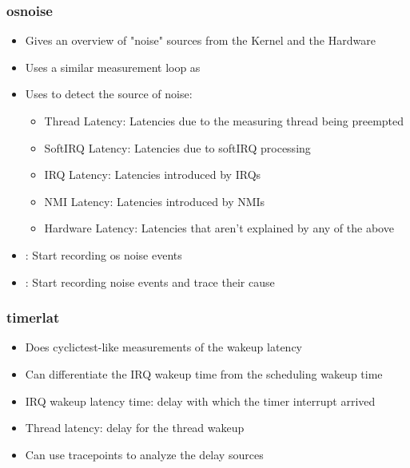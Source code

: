 \begin{frame}
	\frametitle{osnoise}
	\begin{itemize}
		\item Gives an overview of "noise" sources from the Kernel and the Hardware
		\item Uses a similar measurement loop as 
		\item Uses  to detect the source of noise:
			\begin{itemize}
				\item Thread Latency: Latencies due to the measuring thread being preempted
				\item SoftIRQ Latency: Latencies due to softIRQ processing
				\item IRQ Latency: Latencies introduced by IRQs
				\item NMI Latency: Latencies introduced by NMIs
				\item Hardware Latency: Latencies that aren't explained by any of the above
			\end{itemize}
		\item {}: Start recording os noise events
		\item {}: Start recording noise events and trace their cause
	\end{itemize}
\end{frame}

\begin{frame}
	\frametitle{timerlat}
	\begin{itemize}
		\item Does cyclictest-like measurements of the wakeup latency
		\item Can differentiate the IRQ wakeup time from the scheduling wakeup time
		\item IRQ wakeup latency time: delay with which the timer interrupt arrived
		\item Thread latency: delay for the thread wakeup
		\item Can use  tracepoints to analyze the delay sources
	\end{itemize}
\end{frame}

